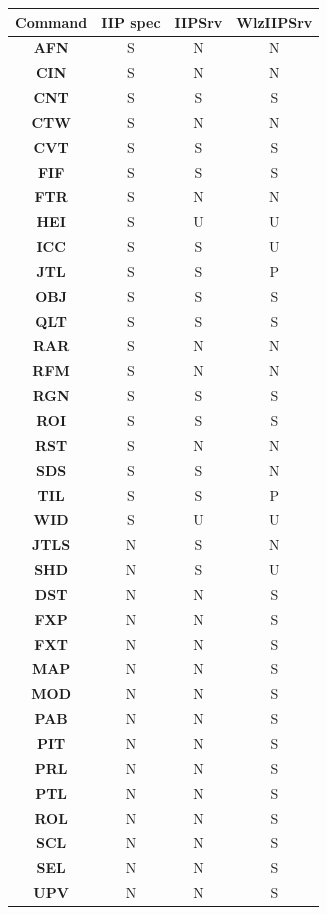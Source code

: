 \documentclass[11pt]{article}
\newcommand{\com}[1]{\textbf{#1}}
\begin{document}
\begin{table}[!hp]
\centering
\tiny{
\begin{tabular}{|c|c|c|c|}
\hline
\textbf{Command} &  \textbf{IIP spec} & \textbf{IIPSrv} & \textbf{WlzIIPSrv}\\
\hline
\com{AFN}  & S & N & N \\
\com{CIN}  & S & N & N \\
\com{CNT}  & S & S & S \\
\com{CTW}  & S & N & N \\
\com{CVT}  & S & S & S \\
\com{FIF}  & S & S & S \\
\com{FTR}  & S & N & N \\
\com{HEI}  & S & U & U \\
\com{ICC}  & S & S & U \\
\com{JTL}  & S & S & P \\
\com{OBJ}  & S & S & S \\
\com{QLT}  & S & S & S \\
\com{RAR}  & S & N & N \\
\com{RFM}  & S & N & N \\
\com{RGN}  & S & S & S \\
\com{ROI}  & S & S & S \\
\com{RST}  & S & N & N \\
\com{SDS}  & S & S & N \\
\com{TIL}  & S & S & P \\
\com{WID}  & S & U & U \\
\hline
\com{JTLS} & N & S & N \\
\com{SHD}  & N & S & U \\
\hline
\com{DST}  & N & N & S \\
\com{FXP}  & N & N & S \\
\com{FXT}  & N & N & S \\
\com{MAP}  & N & N & S \\
\com{MOD}  & N & N & S \\
\com{PAB}  & N & N & S \\
\com{PIT}  & N & N & S \\
\com{PRL}  & N & N & S \\
\com{PTL}  & N & N & S \\
\com{ROL}  & N & N & S \\
\com{SCL}  & N & N & S \\
\com{SEL}  & N & N & S \\
\com{UPV}  & N & N & S \\

\end{tabular}}
\end{table}
\end{document}
